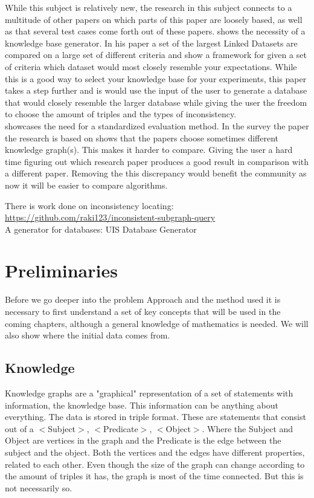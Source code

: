 \documentclass{article}
\begin{document}
While this subject is relatively new, the research in this subject connects to a multitude of other papers on which parts of this paper are loosely based, as well as that several test cases come forth out of these papers. \cite{MichaelF:2017} shows the necessity of a knowledge base generator. In his paper a set of the largest Linked Datasets are compared on a large set of different criteria and show a framework for given a set of criteria which dataset would most closely resemble your expectations. While this is a good way to select your knowledge base for your experiments, this paper takes a step further and is would use the input of the user to generate a database that would closely resemble the larger database while giving the user the freedom to choose the amount of triples and the types of inconsistency.\\
\cite{HeikoP:2016} showcases the need for a standardized evaluation method. In the survey the paper the research is based on shows that the papers choose sometimes different knowledge graph(s). This makes it harder to compare. Giving the user a hard time figuring out which research paper produces a good result in comparison with a different paper. Removing the this discrepancy would benefit the community as now it will be easier to compare algorithms.


There is work done on inconsistency locating: \url{https://github.com/raki123/inconsistent-subgraph-query}\\
A generator for databases: UIS Database Generator\\


\newpage
\section{Preliminaries}
Before we go deeper into the problem Approach and the method used it is necessary to first understand a set of key concepts that will be used in the coming chapters, although a general knowledge of mathematics is needed. We will also show where the initial data comes from.

\subsection{Knowledge}
Knowledge graphs are a "graphical" representation of a set of statements with information, the knowledge base. This information can be anything about everything. The data is stored in triple format. These are statements that consist out of a $<$Subject$>$, $<$Predicate$>$, $<$Object$>$. Where the Subject and Object are vertices in the graph and the Predicate is the edge between the subject and the object. Both the vertices and the edges have different properties, related to each other. Even though the size of the graph can change according to the amount of triples it has, the graph is most of the time connected. But this is not necessarily so. \\
\end{document}
